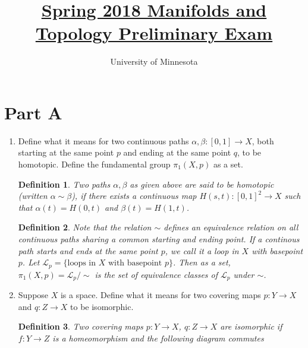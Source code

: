 \documentclass{article}
\title{\href{https://math.umn.edu/sites/math.umn.edu/files/exams/mantops18.pdf}{Spring 2018 Manifolds and Topology Preliminary Exam}}
\author{University of Minnesota}
\date{}
\newtheorem*{definition}{Definition}
\begin{document}
\maketitle

\section*{Part A}
\begin{enumerate}
	\item Define what it means for two continuous paths $\alpha, \beta: [0,1] \rightarrow X$, both starting at the same point $p$ and ending at the same point $q$, to be homotopic. Define the fundamental group $\pi_1 (X, p)$ as a set.
	
	\begin{definition}
		Two paths $\alpha, \beta$ as given above are said to be homotopic (written $\alpha \sim \beta$),
		if there exists a continuous map $H(s,t): [0,1]^2 \rightarrow X$ such that $\alpha(t) = H(0,t)$ and $\beta(t) = H(1,t)$.
	\end{definition}
	
	\begin{definition}
		Note that the relation $\sim$ defines an equivalence relation on all continuous paths sharing a common starting and ending point. 
		If a continous path starts and ends at the same point $p$, we call it a loop in $X$ with basepoint $p$.
		Let $\mathcal{L}_p = \{ \text{loops in $X$ with basepoint $p$} \}$.
		Then as a set, $\pi_1(X,p) = \mathcal{L}_p / \sim$ is the set of equivalence classes of $\mathcal{L}_p$ under $\sim$. 
	\end{definition}
	
	\item Suppose $X$ is a space. Define what it means for two covering maps $p: Y \rightarrow X$ and $q: Z \rightarrow X$ to be isomorphic.
	
	\begin{definition}
		Two covering maps $p:Y \rightarrow X$, $q:Z \rightarrow X$ are isomorphic if $f:Y \rightarrow Z$ is a homeomorphism and the following diagram commutes
		
		\begin{center}
		\end{center}
		
	\end{definition}
	

\end{enumerate}
\end{document}
